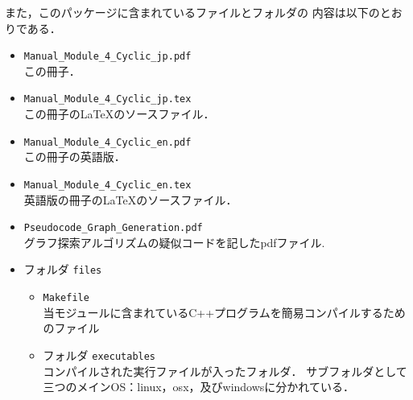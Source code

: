 \documentclass[11pt,titlepage,dvipdfmx,twoside]{jarticle}
\begin{document}
また，このパッケージに含まれているファイルとフォルダの
内容は以下のとおりである．
%
\begin{itemize}
 \item {\tt Manual\_Module\_4\_Cyclic\_jp.pdf}\\
  この冊子．
 \item {\tt Manual\_Module\_4\_Cyclic\_jp.tex}\\
  この冊子の\LaTeX のソースファイル．
 \item {\tt Manual\_Module\_4\_Cyclic\_en.pdf}\\
  この冊子の英語版．
 \item {\tt Manual\_Module\_4\_Cyclic\_en.tex}\\
   英語版の冊子の\LaTeX のソースファイル．
\item{ {\tt Pseudocode\_Graph\_Generation.pdf}}\\
  グラフ探索アルゴリズムの疑似コードを記したpdfファイル.
 
 \item フォルダ {\tt files}
 \begin{itemize}
 \item {\tt Makefile} \\
    当モジュールに含まれているC++プログラムを簡易コンパイルするためのファイル
    
    \item フォルダ {\tt executables}\\
      コンパイルされた実行ファイルが入ったフォルダ．
      サブフォルダとして三つのメインOS：linux，osx，及びwindowsに分かれている．
 

\end{itemize}
\end{itemize}
\end{document}
